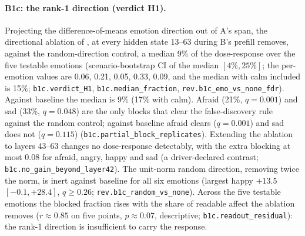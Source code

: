 \documentclass[11pt]{article}
\newcommand{\rid}[1]{{\footnotesize\texttt{#1}}}
\begin{document}
\paragraph{B1c: the rank-1 direction (verdict H1).} Projecting the difference-of-means emotion direction out of A's span, the directional ablation of \citet{arditi2024refusal}, at every hidden state 13--63 during B's prefill removes, against the random-direction control, a median 9\% of the dose-response over the five testable emotions (scenario-bootstrap CI of the median $[4\%, 25\%]$; the per-emotion values are 0.06, 0.21, 0.05, 0.33, 0.09, and the median with calm included is 15\%; \rid{b1c.verdict\_H1}, \rid{b1c.median\_fraction}, \rid{rev.b1c\_emo\_vs\_none\_fdr}). Against baseline the median is 9\% (17\% with calm). Afraid (21\%, $q=0.001$) and sad (33\%, $q=0.048$) are the only blocks that clear the false-discovery rule against the random control; against baseline afraid clears ($q=0.001$) and sad does not ($q=0.115$) (\rid{b1c.partial\_block\_replicates}). Extending the ablation to layers 43--63 changes no dose-response detectably, with the extra blocking at most 0.08 for afraid, angry, happy and sad (a driver-declared contrast; \rid{b1c.no\_gain\_beyond\_layer42}). The unit-norm random direction, removing twice the norm, is inert against baseline for all six emotions (largest happy $+13.5$ $[-0.1, +28.4]$, $q \ge 0.26$; \rid{rev.b1c\_random\_vs\_none}). Across the five testable emotions the blocked fraction rises with the share of readable affect the ablation removes ($r \approx 0.85$ on five points, $p \approx 0.07$, descriptive; \rid{b1c.readout\_residual}): the rank-1 direction is insufficient to carry the response.
\end{document}
